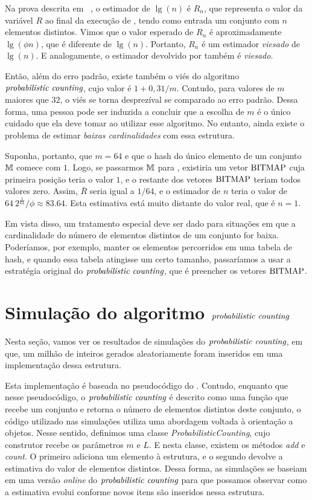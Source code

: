Na prova descrita em ~\citep{flajolet:martin:85}, o estimador de $\lg(n)$ é $R_n$, que representa o valor da variável 
$R$ ao final da execução de , tendo como entrada um conjunto com $n$ elementos distintos. 
Vimos que o valor esperado de $R_n$ é aproximadamente $\lg(\phi n)$, que é diferente de $\lg(n)$. Portanto, $R_n$ é um 
estimador \textit{viesado} de $\lg(n)$. E analogamente, o estimador devolvido por  também 
é \textit{viesado}.  

Então, além do erro padrão, existe também o viés do algoritmo $\textit{probabilistic counting}$, cujo valor é $1 + 0{,}31/m$. Contudo, para 
valores de $m$ maiores que $32$, o viés se torna desprezíval se comparado ao erro padrão. Dessa forma, uma pessoa pode 
ser induzida a concluir que a escolha de $m$ é o único cuidado que ela deve tomar ao utilizar esse algoritmo. No 
entanto, ainda existe o problema de estimar \textit{baixas cardinalidades} com essa estrutura.

Suponha, portanto, que $m = 64$ e que o hash do único elemento de um conjunto $\mathbb{M}$ comece com $1$. Logo, se passarmos 
$\mathbb{M}$ para , existiria um vetor $\text{BITMAP}$ cuja primeira posição teria o valor $1$, e o 
restante dos vetores $\text{BITMAP}$ teriam todos valores zero. Assim, $\bar{R}$ seria igual a $1/64$, e o estimador de $n$ 
teria o valor de $64 \ 2^{\frac{1}{64}}/\phi \approx 83.64$. Esta estimativa está muito distante do valor real, que é 
$n = 1$.

Em vista disso, um tratamento especial deve ser dado para situações em que a cardinalidade do número de elementos 
distintos de um conjunto for baixa. Poderíamos, por exemplo, manter os elementos percorridos em uma tabela de hash, e 
quando essa tabela atingisse um certo tamanho, passaríamos a usar a estratégia original do $\textit{probabilistic counting}$, que é preencher
os vetores $\text{BITMAP}$.  

\section{Simulação do algoritmo $\textit{probabilistic counting}$}

Nesta seção, vamos ver os resultados de simulações do $\textit{probabilistic counting}$, em que, um milhão de inteiros gerados 
aleatoriamente foram inseridos em uma implementação dessa estrutura. 

Esta implementação é baseada no pseudocódigo do . Contudo, enquanto que 
nesse pseudocódigo, o $\textit{probabilistic counting}$ é descrito como uma função que recebe um conjunto e retorna o número de elementos 
distintos deste conjunto, o código utilizado nas simulações utiliza uma abordagem voltada à orientação a objetos. Nesse 
sentido, definimos uma classe \textit{ProbabilisticCounting}, cujo construtor recebe os parâmetros $m$ e $L$. E nesta 
classe, existem os métodos \textit{add} e \textit{count}. O primeiro adiciona um elemento à estrutura, e o segundo 
devolve a estimativa do valor de elementos distintos. Dessa forma, as simulações se baseiam em uma versão 
\textit{online} do $\textit{probabilistic counting}$ para que possamos observar como a estimativa evolui conforme novos itens são inseridos 
nessa estrutura.

